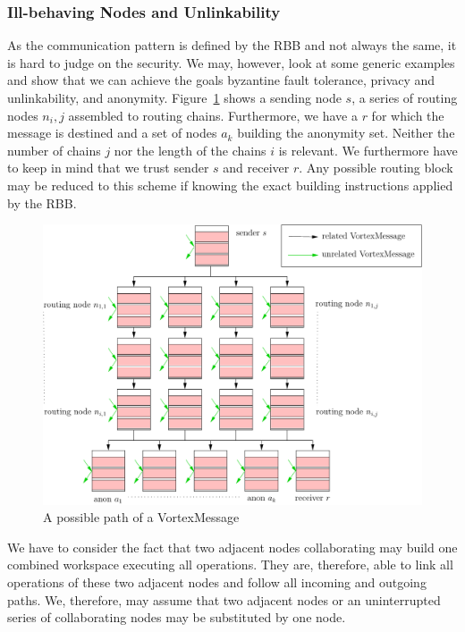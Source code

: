 \documentclass[acmsmall, screen]{acmart}
\begin{document}
\subsubsection{Ill-behaving Nodes and Unlinkability}
As the communication pattern is defined by the RBB and not always the same, it is hard to judge on the security. We may, however, look at some generic examples and show that we can achieve the goals byzantine fault tolerance, privacy and unlinkability, and anonymity. Figure~\ref{fig:messagePaths} shows a sending node $s$, a series of routing nodes $n_i,j$ assembled to routing chains. Furthermore, we have a $r$ for which the message is destined and a set of nodes $a_k$ building the anonymity set. Neither the number of chains $j$ nor the length of the chains $i$ is relevant. We furthermore have to keep in mind that we trust sender $s$ and receiver $r$. Any possible routing block may be reduced to this scheme if knowing the exact building instructions applied by the RBB.
\begin{figure}[ht]
	\centering\includegraphics[width=0.5\columnwidth]{../../inc/messagePaths}
	\caption{A possible path of a VortexMessage}
	\label{fig:messagePaths}
\end{figure}

We have to consider the fact that two adjacent nodes collaborating may build one combined workspace executing all operations. They are, therefore, able to link all operations of these two adjacent nodes and follow all incoming and outgoing paths. We, therefore, may assume that two adjacent nodes or an uninterrupted series of collaborating nodes may be substituted by one node.
\end{document}
